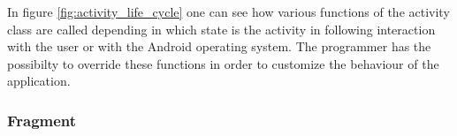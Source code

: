 In figure \ref{fig:activity_life_cycle} one can see how various functions of the activity class are called depending in which state is the activity in following interaction with the user or with the Android operating system. The programmer has the possibilty to override these functions in order to customize the behaviour of the application.
\subsubsection { Fragment }